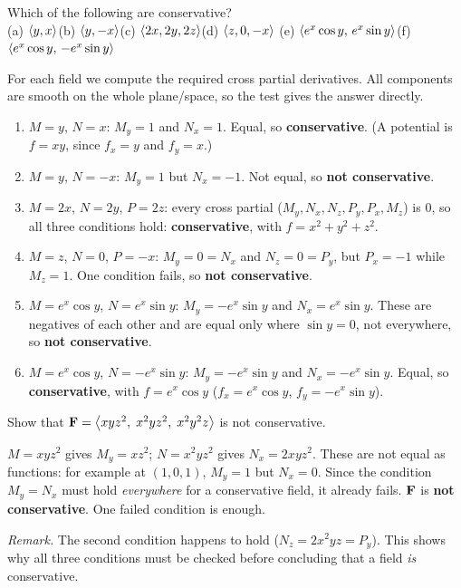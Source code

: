 \begin{problem}\label{q:which}
Which of the following are conservative?\\
(a) $\left\langle y,x \right\rangle$\quad (b) $\left\langle y,-x \right\rangle$\quad (c) $\left\langle 2x,2y,2z \right\rangle$\quad (d) $\left\langle z,0,-x \right\rangle$\quad
(e) $\left\langle e^x\cos y,\,e^x\sin y \right\rangle$\quad (f) $\left\langle e^x\cos y,\,-e^x\sin y \right\rangle$
\end{problem}
\begin{solution}
For each field we compute the required cross partial derivatives. All components are
smooth on the whole plane/space, so the test gives the answer directly.
\begin{enumerate}[label=(\alph*)]
\item $M=y$, $N=x$: $M_y=1$ and $N_x=1$. Equal, so \textbf{conservative}. (A potential is $f=xy$,
      since $f_x=y$ and $f_y=x$.)
\item $M=y$, $N=-x$: $M_y=1$ but $N_x=-1$. Not equal, so \textbf{not conservative}.
\item $M=2x$, $N=2y$, $P=2z$: every cross partial ($M_y,N_x,N_z,P_y,P_x,M_z$) is $0$, so all three
      conditions hold: \textbf{conservative}, with $f=x^2+y^2+z^2$.
\item $M=z$, $N=0$, $P=-x$: $M_y=0=N_x$ and $N_z=0=P_y$, but $P_x=-1$ while $M_z=1$. One condition
      fails, so \textbf{not conservative}.
\item $M=e^x\cos y$, $N=e^x\sin y$: $M_y=-e^x\sin y$ and $N_x=e^x\sin y$. These are negatives of each
      other and are equal only where $\sin y=0$, not everywhere, so \textbf{not conservative}.
\item $M=e^x\cos y$, $N=-e^x\sin y$: $M_y=-e^x\sin y$ and $N_x=-e^x\sin y$. Equal, so
      \textbf{conservative}, with $f=e^x\cos y$ ($f_x=e^x\cos y$, $f_y=-e^x\sin y$).
\end{enumerate}
\end{solution}

\begin{problem}\label{q:notcons3}
Show that $\mathbf{F}=\left\langle xyz^2,\;x^2yz^2,\;x^2y^2z \right\rangle$ is not conservative.
\end{problem}
\begin{solution}
 $M=xyz^2$ gives $M_y=xz^2$; $N=x^2yz^2$ gives $N_x=2xyz^2$.
 These are not equal as functions: for example at $(1,0,1)$, $M_y=1$ but
$N_x=0$. Since the condition $M_y=N_x$ must hold \emph{everywhere} for a conservative
field, it already fails.
 $\mathbf{F}$ is \textbf{not conservative}. One failed condition is enough.

\emph{Remark.} The second condition happens to hold ($N_z=2x^2yz=P_y$). This shows why
all three conditions must be checked before concluding that a field \emph{is}
conservative.
\end{solution}

